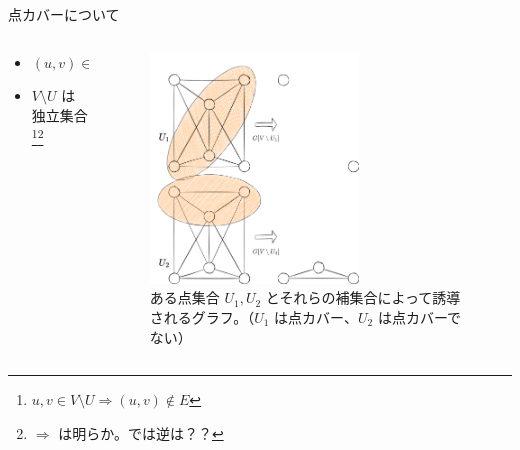 \documentclass[aspectratio=169]{beamer}
\begin{document}
\begin{frame}{点カバーについて}
	\begin{columns}
		\begin{column}{0.4\textwidth}
			\begin{itemize}
				\item \((u, v) \in E \Rightarrow u \in U \lor v \in U\)
			\end{itemize}
			\begin{itemize}
				\item \(V \setminus U\) は独立集合\footnote{\(u, v \in V \setminus U \Rightarrow (u, v) \notin E\)}\footnote{\(\Rightarrow\) は明らか。では逆は？？}
			\end{itemize}
		\end{column}
		\begin{column}{0.6\textwidth}
			\begin{figure}
				\centering
				\includegraphics[width=0.65\textwidth]{figures/vertex-cover.png}
				\caption{ある点集合 \(U_1, U_2\) とそれらの補集合によって誘導されるグラフ。（\(U_1\) は点カバー、\(U_2\) は点カバーでない）}
			\end{figure}
		\end{column}
	\end{columns}
\end{frame}
\end{document}
